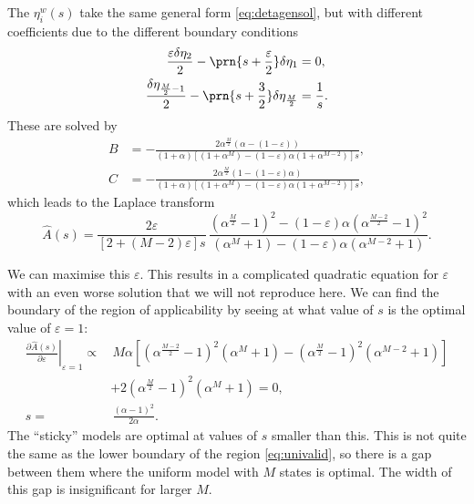 \documentclass[12pt]{article}
\renewcommand{\pdiff}[2]{\frac{\partial #1}{\partial #2}}
\begin{document}
The $\eta^w_i(s)$ take the same general form \eqref{eq:detagensol}, but with different coefficients due to the different boundary conditions
%
\begin{equation}\label{eq:detabndsticky}
\begin{aligned}
  \frac{\varepsilon\delta\eta_2}{2} - \prn{s+\frac{\varepsilon}{2}}\delta\eta_1 &= 0, \\
  \frac{\delta\eta_{\frac{M}{2}-1}}{2} - \prn{s+\frac{3}{2}}\delta\eta_{\frac{M}{2}} &= \frac{1}{s}.
\end{aligned}
\end{equation}
%
These are solved by
%
\begin{equation}\label{eq:stickycoeffs}
\begin{aligned}
  B &= -\frac{ 2 \alpha^{\frac{M}{2}} (\alpha-(1-\varepsilon)) }{ (1+\alpha) [(1+\alpha^{M}) - (1-\varepsilon) \alpha (1+\alpha^{M-2}) ]s}, \\
  C &= -\frac{ 2 \alpha^{\frac{M}{2}} (1-(1-\varepsilon)\alpha) }{ (1+\alpha) [(1+\alpha^{M}) - (1-\varepsilon) \alpha (1+\alpha^{M-2}) ]s},
\end{aligned}
\end{equation}
%
which leads to the Laplace transform
%
\begin{equation}\label{eq:stickylaplace}
  \hat{A}(s) = \frac{2\varepsilon}{[2+(M-2)\varepsilon]s} \, 
      \frac{ (\alpha^{\frac{M}{2}}-1)^2 - (1-\varepsilon)\alpha(\alpha^{\frac{M-2}{2}}-1)^2 }{ (\alpha^M + 1) - (1-\varepsilon)\alpha(\alpha^{M-2}+1) }.
\end{equation}
%

We can maximise this \wrt $\varepsilon$.
This results in a complicated quadratic equation for $\varepsilon$ with an even worse solution that we will not reproduce here.
We can find the boundary of the region of applicability by seeing at what value of $s$ is the optimal value of $\varepsilon=1$:
%
\begin{equation}\label{eq:stickyvalid}
\begin{aligned}
  \left.\pdiff{\hat{A}(s)}{\varepsilon}\right|_{\varepsilon=1} \propto &\,
    M\alpha[(\alpha^{\frac{M-2}{2}}-1)^2(\alpha^M+1) - (\alpha^{\frac{M}{2}}-1)^2(\alpha^{M-2}+1)]
     \\ &+ 2(\alpha^{\frac{M}{2}}-1)^2(\alpha^M+1) = 0,\\
    s = &\, \frac{(\alpha-1)^2}{2\alpha}.
\end{aligned}
\end{equation}
%
The ``sticky'' models are optimal at values of $s$ smaller than this.
This is not quite the same as the lower boundary of the region \eqref{eq:univalid}, so there is a gap between them where the uniform model with $M$ states is optimal.
The width of this gap is insignificant for larger $M$.
\end{document}

